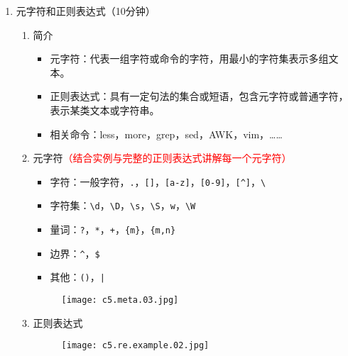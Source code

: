 \documentclass{TIJMUjiaoanSY}
\begin{document}

\firstTail


\newpage
\otherHeader

\noindent
\begin{enumerate}
  \item 元字符和正则表达式（10分钟）
    \begin{enumerate}
      \item 简介
	\begin{itemize}
	  \item 元字符：代表一组字符或命令的字符，用最小的字符集表示多组文本。
	  \item 正则表达式：具有一定句法的集合或短语，包含元字符或普通字符，表示某类文本或字符串。
	  \item 相关命令：less，more，grep，sed，AWK，vim，……
	\end{itemize}
      \item 元字符\textcolor{red}{（结合实例与完整的正则表达式讲解每一个元字符）}
	\begin{itemize}
	  \item 字符：一般字符，\verb|.|，\verb|[]|，\verb|[a-z]|，\verb|[0-9]|，\verb|[^]|，\verb|\|
	  \item 字符集：\verb|\d|，\verb|\D|，\verb|\s|，\verb|\S|，\verb|w|，\verb|\W|
	  \item 量词：\verb|?|，\verb|*|，\verb|+|，\verb|{m}|，\verb|{m,n}|
	  \item 边界：\verb|^|，\verb|$|
	  \item 其他：\verb|()|，\verb=|=
	\end{itemize}
	\vspace*{-8pt}
	\begin{figure}[h]
	  \centering
	  \texttt{[image: c5.meta.03.jpg]}
	\end{figure}
	\vspace*{-8pt}
      \item 正则表达式
	\vspace*{-8pt}
	\begin{figure}[h]
	  \centering
	  \texttt{[image: c5.re.example.02.jpg]}
	\end{figure}
	\vspace*{-8pt}
    \end{enumerate}


\end{enumerate}
\end{document}
